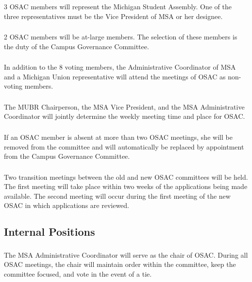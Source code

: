 \subsubsection{}
3 OSAC members will represent the Michigan Student Assembly.  One of the three representatives must be the Vice President of MSA or her designee. 
\subsubsection{}
2 OSAC members will be at-large members.  The selection of these members is the duty of the Campus Governance Committee.
\subsubsection{}
In addition to the 8 voting members, the Administrative Coordinator of MSA and a Michigan Union representative will attend the meetings of OSAC as non-voting members.
\subsubsection{}
The MUBR Chairperson, the MSA Vice President, and the MSA Administrative Coordinator will jointly determine the weekly meeting time and place for OSAC.
\subsubsection{}
If an OSAC member is absent at more than two OSAC meetings, she will be removed from the committee and will automatically be replaced by appointment from the Campus Governance Committee.
\subsubsection{}
Two transition meetings between the old and new OSAC committees will be held.  The first meeting will take place within two weeks of the applications being made available.  The second meeting will occur during the first meeting of the new OSAC in which applications are reviewed.

\subsection{Internal Positions}
\subsubsection{}
The MSA Administrative Coordinator will serve as the chair of OSAC.  During all OSAC meetings, the chair will maintain order within the committee, keep the committee focused, and vote in the event of a tie.
